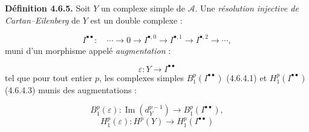 \medskip\noindent\textbf{Définition 4.6.5.}\quad
Soit $Y$ un complexe simple de $\mathcal A$. Une \emph{résolution injective
de Cartan--Eilenberg} de $Y$ est un double complexe :

\[
I^{\bullet\bullet}\colon\quad
\cdots\longrightarrow0\longrightarrow I^{\bullet,0}
\longrightarrow I^{\bullet,1}\longrightarrow I^{\bullet,2}
\longrightarrow\cdots,
\]
muni d'un morphisme appelé \emph{augmentation} :

\[
\varepsilon\colon Y\longrightarrow I^{\bullet\bullet}
\]
tel que pour tout entier $p$, les complexes simples
$B_1^p(I^{\bullet\bullet})$ (4.6.4.1) et
$H_1^p(I^{\bullet\bullet})$ (4.6.4.3) munis des augmentations :

\[
B_1^p(\varepsilon)\colon
\operatorname{Im}(d_Y^{p-1})\longrightarrow B_1^p(I^{\bullet\bullet}),
\]
\[
H_1^p(\varepsilon)\colon
H^p(Y)\longrightarrow H_1^p(I^{\bullet\bullet})
\]
\endgroup
